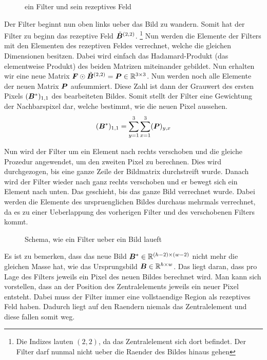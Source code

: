 \begin{figure}[h!]

  \caption{ein Filter und sein rezeptives Feld}
  \label{fig:receptive_field}
\end{figure}

\para{}
Der Filter beginnt nun oben links ueber das Bild zu wandern. Somit
hat der Filter zu beginn das rezeptive Feld $\tilde{\bm{B}}^{(2,2)}$.
\footnote{Die Indizes lauten $(2,2)$, da das Zentralelement sich dort befindet.
  Der Filter darf nunmal nicht ueber die Raender des Bildes hinaus gehen}
Nun werden die Elemente der Filters mit den Elementen des rezeptiven Feldes
verrechnet, welche die gleichen Dimensionen besitzen. Dabei wird einfach das
Hadamard-Produkt (das elementweise Produkt) des beiden Matrizen miteinander
gebildet. Nun erhalten wir eine neue Matrix $\bm{F} \odot
\tilde{\bm{B}}^{(2,2)} = \bm{P} \in \mathbb{R}^{3 \times 3}$.
Nun werden noch alle Elemente der neuen Matrix $\bm{P}$
aufsummiert. Diese Zahl ist dann der Grauwert des ersten Pixels $(\bm{B}^*)_{1,1}$ des bearbeiteten
Bildes. Somit stellt der Filter eine Gewichtung der Nachbarspixel dar, welche
bestimmt, wie die neuen Pixel aussehen.
\begin{equation*}
  (\bm{B}^*)_{1,1} = \sum_{y=1}^3 \sum_{x=1}^3 (\bm{P})_{y,x}
\end{equation*}

Nun wird der Filter um ein Element nach rechts verschoben und die gleiche
Prozedur angewendet, um den zweiten Pixel zu berechnen. Dies
wird durchgezogen, bis eine ganze Zeile der Bildmatrix durchstreift wurde.
Danach wird der Filter wieder nach ganz rechts verschoben und er bewegt sich ein
Element nach unten. Das geschieht, bis das ganze Bild verrechnet wurde.
Dabei werden die Elemente des urspruenglichen Bildes durchaus mehrmals
verrechnet, da es zu einer Ueberlappung des vorherigen Filter und des
verschobenen Filters kommt.

\begin{figure}[h!]

  \caption{Schema, wie ein Filter ueber ein Bild laueft}
\end{figure}

Es ist zu bemerken, dass das neue Bild $\bm{B}^* \in \mathbb{R}^{(h-2) \times (w-2)}$ nicht mehr die gleichen Masse
hat, wie das Ursprungsbild $\bm{B} \in \mathbb{R}^{h \times w}$. Das liegt daran, dass pro
Lage des Filters jeweils ein Pixel des neuen Bildes berechnet wird. Man kann
sich vorstellen, dass an der Position des Zentralelements jeweils ein neuer
Pixel entsteht. Dabei muss der Filter immer eine vollstaendige Region als
rezeptives Feld haben. Dadurch liegt auf den Raendern niemals das Zentralelement
und diese fallen somit weg.
\para{}
\cite{deeplearning.ai:cnn}
\cite{wiki:convolution}

